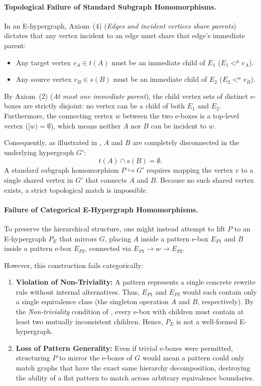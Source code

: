\documentclass[11pt,a4paper]{article}
\theoremstyle{definition}
\theoremstyle{plain}
\begin{document}
\paragraph{Topological Failure of Standard Subgraph Homomorphisms.}
In an E-hypergraph, Axiom~(4) (\emph{Edges and incident vertices share parents}) dictates that any vertex incident to an edge must share that edge's immediate parent:
\begin{itemize}
    \item Any target vertex $v_A \in t(A)$ must be an immediate child of $E_1$ ($E_1 <^\mu v_A$).
    \item Any source vertex $v_B \in s(B)$ must be an immediate child of $E_2$ ($E_2 <^\mu v_B$).
\end{itemize}
By Axiom~(2) (\emph{At most one immediate parent}), the child vertex sets of distinct e-boxes are strictly disjoint: no vertex can be a child of both $E_1$ and $E_2$. Furthermore, the connecting vertex $w$ between the two e-boxes is a top-level vertex ($[w) = \emptyset$), which means neither $A$ nor $B$ can be incident to $w$.

Consequently, as illustrated in , $A$ and $B$ are completely disconnected in the underlying hypergraph $G'$:
\[
t(A) \cap s(B) = \emptyset.
\]
A standard subgraph homomorphism $P \hookrightarrow G'$ requires mapping the vertex $v$ to a single shared vertex in $G'$ that connects $A$ and $B$. Because no such shared vertex exists, a strict topological match is impossible.

\paragraph{Failure of Categorical E-Hypergraph Homomorphisms.}
To preserve the hierarchical structure, one might instead attempt to lift $P$ to an E-hypergraph $P_E$ that mirrors $G$, placing $A$ inside a pattern e-box $E_{P1}$ and $B$ inside a pattern e-box $E_{P2}$, connected via $E_{P1} \to w \to E_{P2}$.

However, this construction fails categorically:
\begin{enumerate}
    \item \textbf{Violation of Non-Triviality:} A pattern represents a single concrete rewrite rule without internal alternatives. Thus, $E_{P1}$ and $E_{P2}$ would each contain only a single equivalence class (the singleton operation $A$ and $B$, respectively). By the \emph{Non-triviality} condition of , every e-box with children must contain at least two mutually inconsistent children. Hence, $P_E$ is not a well-formed E-hypergraph.
    \item \textbf{Loss of Pattern Generality:} Even if trivial e-boxes were permitted, structuring $P$ to mirror the e-boxes of $G$ would mean a pattern could only match graphs that have the exact same hierarchy decomposition, destroying the ability of a flat pattern to match across arbitrary equivalence boundaries.
\end{enumerate}
\end{document}
